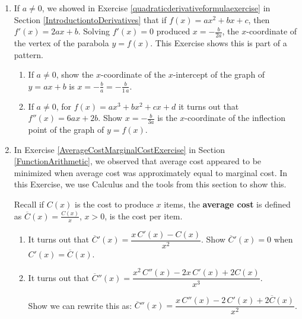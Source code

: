 \documentclass{ximera}
\begin{document}
\begin{enumerate}
\setcounter{enumi}{\value{HW}}

\item If $a \neq 0$, we showed in Exercise \ref{quadraticderivativeformulaexercise} in Section \ref{IntroductiontoDerivatives} that if $f(x) = ax^2 + bx + c$, then $f'(x) = 2ax + b$. Solving $f'(x) = 0$ produced $x = -\frac{b}{2a}$, the $x$-coordinate of the vertex of the parabola $y = f(x)$. This Exercise shows this is part of a pattern.

\begin{enumerate}  \item  If $a \neq 0$, show the $x$-coordinate of the $x$-intercept of the graph of $y = ax + b$ is $x = -\frac{b}{a} = -\frac{b}{1 \, a}$.

\item  If $a \neq 0$, for $f(x) = ax^3 + bx^2 + cx + d$ it turns out that $f''(x) = 6ax + 2b$.  Show $x = -\frac{b}{3a}$ is the $x$-coordinate of the inflection point of the graph of $y = f(x)$.

\end{enumerate}

\item\label{MinimizeAverageCostProofExercise}  In Exercise \ref{AverageCostMarginalCostExercise} in Section \ref{FunctionArithmetic}, we observed that average cost appeared to be minimized when average cost was approximately equal to marginal cost.  In this Exercise, we use Calculus and the tools from this section to show this. 

\smallskip

 Recall if $C(x)$ is the cost to produce $x$ items, the \textbf{average cost} is defined as $\overline{C}(x) = \frac{C(x)}{x}$, $x > 0$,  is the cost per item. 
\begin{enumerate}

\item\label{avgcostcostderivequal}  It turns out that $\overline{C}'(x) = \dfrac{x \, C'(x) - C(x)}{x^2}$.  Show  $\overline{C}'(x) = 0$ when $C'(x) = \overline{C}(x)$.

\smallskip

\item  It turns out that $\overline{C}''(x) = \dfrac{x^2 \, C''(x) - 2x\, C'(x) + 2C(x)}{x^3}$. 

\smallskip

Show we can rewrite this as: $\overline{C}''(x) = \dfrac{x \, C''(x) - 2\, C'(x) + 2 \overline{C}(x)}{x^2}$.


\end{enumerate}
\end{enumerate}
\end{document}
